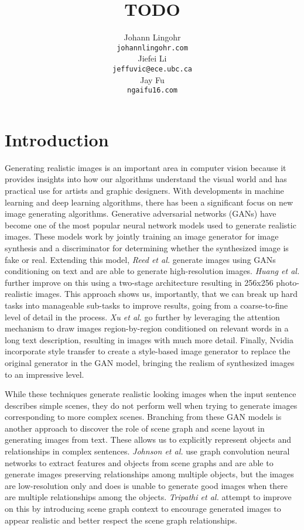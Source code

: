 \documentclass{article}
\title{TODO}
\author{%
  Johann Lingohr \\
  \texttt{johannlingohr\@gmail.com} \\
  \And
  Jiefei Li \\
  \texttt{jeffuvic@ece.ubc.ca} \\
  \And
  Jay Fu \\
  \texttt{ngaifu16\@gmail.com} \\
}
\begin{document}

\maketitle

\section{Introduction}

Generating realistic images is an important area in computer vision because it provides insights into how our algorithms understand the visual world and has practical use for artists and graphic designers. With developments in machine learning and deep learning algorithms, there has been a significant focus on new image generating algorithms. Generative adversarial networks (GANs) \cite{gan} have become one of the most popular neural network models used to generate realistic images. These models work by jointly training an image generator for image synthesis and a discriminator for determining whether the synthesized image is fake or real. Extending this model, \textit{Reed et al.} \cite{t2im} generate images using GANs conditioning on text and are able to generate high-resolution images. \textit{Huang et al.} \cite{stackedgan} further improve on this using a two-stage architecture resulting in 256x256 photo-realistic images. This approach shows us, importantly, that we can break up hard tasks into manageable sub-tasks to improve results, going from a coarse-to-fine level of detail in the process. \textit{Xu et al.} \cite{attengan} go further by leveraging the attention mechanism to draw images region-by-region conditioned on relevant words in a long text description, resulting in images with much more detail. Finally, Nvidia \cite{stylegan} incorporate style transfer to create a style-based image generator to replace the original generator in the GAN model, bringing the realism of synthesized images to an impressive level.

While these techniques generate realistic looking images when the input sentence describes simple scenes, they do not perform well when trying to generate images corresponding to more complex scenes. Branching from these GAN models is another approach to discover the role of scene graph and scene layout in generating images from text. These allows us to explicitly represent objects and relationships in complex sentences. \textit{Johnson et al.} \cite{sg2im} use graph convolution neural networks to extract features and objects from scene graphs and are able to generate images preserving relationships among multiple objects, but the images are low-resolution only and does is unable to generate good images when there are multiple relationships among the objects. \textit{Tripathi et al.} \cite{sg2imgcontext} attempt to improve on this by introducing scene graph context to encourage generated images to appear realistic and better respect the scene graph relationships.
\end{document}
